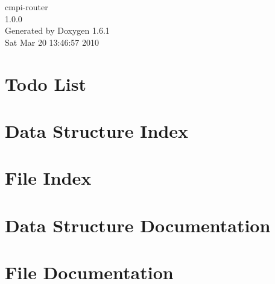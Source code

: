 \documentclass[a4paper]{book}
\begin{document}
\hypersetup{pageanchor=false}
\begin{titlepage}
\vspace*{7cm}
\begin{center}
{\Large cmpi-\/router \\[1ex]\large 1.0.0 }\\
\vspace*{1cm}
{\large Generated by Doxygen 1.6.1}\\
\vspace*{0.5cm}
{\small Sat Mar 20 13:46:57 2010}\\
\end{center}
\end{titlepage}
\clearemptydoublepage
{}
\tableofcontents
\clearemptydoublepage
{}
\hypersetup{pageanchor=true}
\chapter{Todo List}
\label{todo}
\hypertarget{todo}{}

\chapter{Data Structure Index}

\chapter{File Index}

\chapter{Data Structure Documentation}









\chapter{File Documentation}


















\printindex
\end{document}
